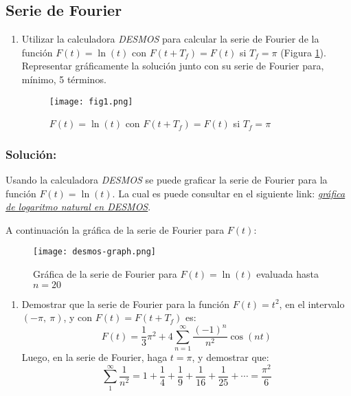 





\begin{multicols}{2}

\section{Serie de Fourier}

\begin{enumerate}[leftmargin=15pt]
    \item Utilizar la calculadora \textit{DESMOS} para calcular la serie de Fourier de la función $F(t) = \ln(t)$ con $F(t+T_f) = F(t)$ si $T_f = \pi$ (Figura \ref{figenu:1}). Representar gráficamente la solución junto con su serie de Fourier para, mínimo, 5 términos.
    
    \begin{figure}[H]
    \begin{center}
    \texttt{[image: fig1.png]}
    \caption{$F(t) = \ln(t)$ con $F(t+T_f) = F(t)$ si $T_f = \pi$}
    \label{figenu:1}
    \end{center}
    \end{figure}
\end{enumerate}

\subsubsection*{Solución:}

Usando la calculadora \textit{DESMOS} se puede graficar la serie de Fourier para la función $F(t) = \ln(t)$. La cual es puede consultar en el siguiente link: \href{https://www.desmos.com/calculator/pu9ukvn7qk}{\textcolor{rojo}{\textit{gráfica de logaritmo natural en DESMOS}}}.

A continuación la gráfica de la serie de Fourier para $F(t)$:

\begin{figure}[H]
\begin{center}
\texttt{[image: desmos-graph.png]}
\caption{Gráfica de la serie de Fourier para $F(t)=\ln(t)$ evaluada hasta $n=20$}
\label{fig1}
\end{center}
\end{figure}

\begin{enumerate}[leftmargin=15pt, resume]
    \item Demostrar que la serie de Fourier para la función $F(t) = t^{2}$, en el intervalo $(-\pi,~\pi)$, y con $F(t) = F(t + T_f)$ es:
    \begin{equation*}
        F(t) = \frac{1}{3} \pi^{2} + 4 \sum_{n = 1}^{\infty} \frac{(-1)^{n}}{n^{2}} \cos(nt)
    \end{equation*}
    Luego, en la serie de Fourier, haga $t = \pi$, y demostrar que:
    \begin{equation*}
        \sum_{1}^{\infty} \frac{1}{n^{2}} = 1 + \frac{1}{4} + \frac{1}{9} + \frac{1}{16} + \frac{1}{25} + \cdots = \frac{\pi^{2}}{6}
    \end{equation*}
\end{enumerate}


\end{multicols}
